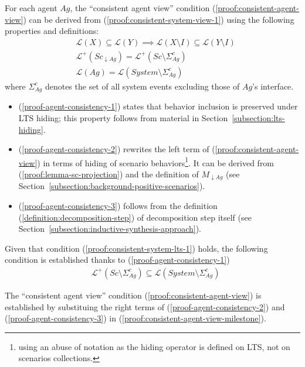 For each agent $Ag$, the ``consistent agent view'' condition (\ref{proof:consistent-agent-view}) can be derived from (\ref{proof:consistent-system-view-1}) using the following properties and definitions:
\begin{align}
&\mathcal{L}(X) \subseteq \mathcal{L}(Y) \implies \mathcal{L}(X \setminus I) \subseteq \mathcal{L}(Y \setminus I) \label{proof-agent-consistency-1}\\
&\mathcal{L}^+(Sc_{\downarrow Ag}) = \mathcal{L}^+(Sc \setminus \Sigma_{Ag}^c)\label{proof-agent-consistency-2}\\
&\mathcal{L}(Ag) = \mathcal{L}(System \setminus \Sigma_{Ag}^c)\label{proof-agent-consistency-3}
\end{align}
where $\Sigma_{Ag}^c$ denotes the set of all system events excluding those of $Ag$'s interface.
\begin{itemize}
\item (\ref{proof-agent-consistency-1}) states that behavior inclusion is preserved under LTS hiding; this property follows from material in Section~\ref{subsection:lts-hiding}. 
\item (\ref{proof-agent-consistency-2}) rewrites the left term of (\ref{proof:consistent-agent-view}) in terms of hiding of scenario behaviors\footnote{using an abuse of notation as the hiding operator is defined on LTS, not on scenarios collections.}. It can be derived from (\ref{proof:lemma-sc-projection}) and the definition of $M_{\downarrow Ag}$ (see Section~\ref{subsection:background-positive-scenarios}). 
\item (\ref{proof-agent-consistency-3}) follows from the definition (\ref{definition:decomposition-step}) of decomposition step itself (see Section~\ref{subsection:inductive-synthesis-approach}). 
\end{itemize}

Given that condition (\ref{proof:consistent-system-lts-1}) holds, the following condition is established thanks to (\ref{proof-agent-consistency-1})
\begin{align}
&\mathcal{L}^+(Sc \setminus \Sigma_{Ag}^c) \subseteq \mathcal{L}(System \setminus \Sigma_{Ag}^c)\label{proof:consistent-agent-view-milestone}
\end{align}

The ``consistent agent view'' condition (\ref{proof:consistent-agent-view}) is established by substituing the right terms of (\ref{proof-agent-consistency-2}) and (\ref{proof-agent-consistency-3}) in (\ref{proof:consistent-agent-view-milestone}).

